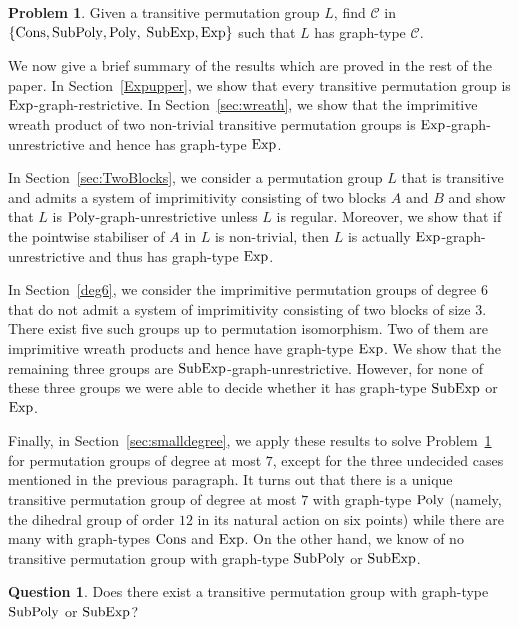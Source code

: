 \documentclass{amsart}
\theoremstyle{definition}
\newtheorem{problem}[theorem]{Problem}
\newtheorem{question}[theorem]{Question}
\begin{document}
\begin{problem}\label{mainprob}
Given a transitive permutation group $L$, find ${\mathcal C}$ in $\{{\mathop{\rm Cons}},{\mathop{\rm SubPoly}},{\mathop{\rm Poly}},$ ${\mathop{\rm SubExp}},{\mathop{\rm Exp}}\}$ such that $L$ has graph-type ${\mathcal C}$.
\end{problem}

We now give a brief summary of the results which are proved in the rest of the paper. In Section~\ref{Expupper}, we show that every transitive permutation group is ${\mathop{\rm Exp}}$-graph-restrictive. In Section~\ref{sec:wreath}, we show that the imprimitive wreath product of two non-trivial transitive permutation groups is ${\mathop{\rm Exp}}$-graph-unrestrictive and hence has graph-type ${\mathop{\rm Exp}}$.

In Section~\ref{sec:TwoBlocks}, we consider a permutation group $L$ that is transitive and admits a system of imprimitivity consisting of two blocks $A$ and $B$ and show that $L$ is ${\mathop{\rm Poly}}$-graph-unrestrictive unless $L$ is regular. Moreover, we show that if the pointwise stabiliser of $A$ in $L$ is non-trivial, then $L$ is actually ${\mathop{\rm Exp}}$-graph-unrestrictive and thus has graph-type ${\mathop{\rm Exp}}$.

In Section~\ref{deg6}, we consider the imprimitive permutation groups of degree $6$ that do not admit a system of imprimitivity consisting of two blocks of size $3$. There exist five such groups up to permutation isomorphism. Two of them are imprimitive wreath products and hence have graph-type ${\mathop{\rm Exp}}$. We show that the remaining three groups are ${\mathop{\rm SubExp}}$-graph-unrestrictive. However, for none of these three groups we were able to decide whether it has graph-type ${\mathop{\rm SubExp}}$ or ${\mathop{\rm Exp}}$.

Finally, in Section~\ref{sec:smalldegree}, we apply these results to solve Problem~\ref{mainprob} for permutation groups of degree at most $7$, except for the three undecided cases mentioned in the previous paragraph.  It turns out that there is a unique transitive permutation group of degree at most $7$ with graph-type ${\mathop{\rm Poly}}$ (namely, the dihedral group of order $12$ in its natural action on six points) while there are many with graph-types ${\mathop{\rm Cons}}$ and ${\mathop{\rm Exp}}$. On the other hand, we know of no transitive permutation group with graph-type ${\mathop{\rm SubPoly}}$ or ${\mathop{\rm SubExp}}$.

\begin{question}
Does there exist a transitive permutation group with graph-type ${\mathop{\rm SubPoly}}$ or ${\mathop{\rm SubExp}}$?
\end{question}
\end{document}
